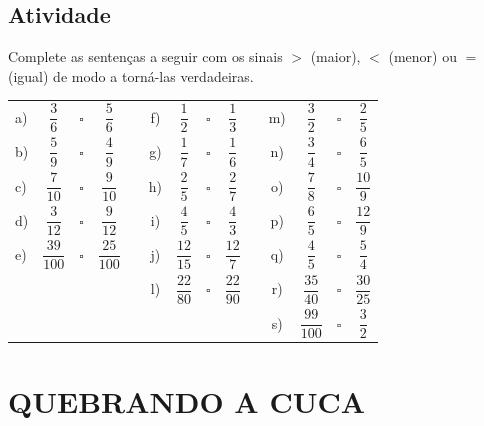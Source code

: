 \subsection{Atividade}


Complete as sentenças a seguir com os sinais $>$ (maior), $<$ (menor) ou $=$ (igual) de modo a torná-las verdadeiras.

\begin{center}
\begin{tabular}{lccccccccccccc}
 a)  &  $\dfrac{3}{6}$     &{\huge $\square$}  &  $\dfrac{5}{6}$   & \parbox[t][.6cm]{2cm}{ } \quad \quad\quad  & f)  &  $\dfrac{1}{2}$     & {\huge $\square$} &  $\dfrac{1}{3}$    & \quad \quad\quad  & m)  &  $\dfrac{3}{2}$     & {\huge $\square$} &  $\dfrac{2}{5}$    \\
 b)  &  $\dfrac{5}{9}$     &{\huge $\square$}&  $\dfrac{4}{9}$   & \parbox[t][.6cm]{2cm}{ }    & g)  &  $\dfrac{1}{7}$     &{\huge $\square$} &  $\dfrac{1}{6}$    &   & n)  &  $\dfrac{3}{4}$     &{\huge $\square$} &  $\dfrac{6}{5}$    \\
 c)  &  $\dfrac{7}{10}$    &{\huge $\square$} &  $\dfrac{9}{10}$   & \parbox[t][.6cm]{2cm}{ }   & h)  &  $\dfrac{2}{5}$     &{\huge $\square$}&  $\dfrac{2}{7}$    &   & o)  &  $\dfrac{7}{8}$     &{\huge $\square$} &  $\dfrac{10}{9}$   \\
 d)  &  $\dfrac{3}{12}$    &{\huge $\square$}&  $\dfrac{9}{12}$   & \parbox[t][.6cm]{2cm}{ }   & i)  &  $\dfrac{4}{5}$     &{\huge $\square$}&  $\dfrac{4}{3}$    &   & p)  &  $\dfrac{6}{5}$     &{\huge $\square$}&  $\dfrac{12}{9}$   \\
 e)  &  $\dfrac{39}{100}$  &{\huge $\square$}&  $\dfrac{25}{100}$ & \parbox[t][.6cm]{2cm}{ }   & j)  &  $\dfrac{12}{15}$   &{\huge $\square$}&  $\dfrac{12}{7}$   &   & q)  &  $\dfrac{4}{5}$     &{\huge $\square$}&  $\dfrac{5}{4}$    \\
     &&                     &    &                  \parbox[t][.6cm]{2cm}{ }    &  l)  &  $\dfrac{22}{80}$   &{\huge $\square$}&  $\dfrac{22}{90}$  &   & r)  &  $\dfrac{35}{40}$   &{\huge $\square$}&  $\dfrac{30}{25}$  \\
     &&                      &    &                    &      &  \parbox[t][.6cm]{2cm}{ }                    &   &                   &   &  s)  &  $\dfrac{99}{100}$  &{\huge $\square$}&  $\dfrac{3}{2}$    \\
\end{tabular}
 \end{center}

\section{QUEBRANDO A CUCA }



